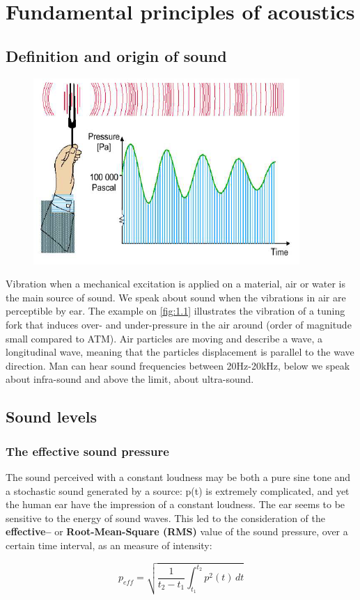 
\chapter{Fundamental principles of acoustics}
\section{Definition and origin of sound}
	\begin{figure}
	\vspace{-6mm}
	\includegraphics[scale=0.5]{acoustics/ch1/1}
	\label{fig:1.1}
	\end{figure}	
	Vibration when a mechanical excitation is applied on a material, air or water is the main source of sound. We speak about sound when the vibrations in air are perceptible by ear. The example on \autoref{fig:1.1} illustrates the vibration of a tuning fork that induces over- and under-pressure in the air around (order of magnitude small compared to ATM). Air particles are moving and describe a wave, a longitudinal wave, meaning that the particles displacement is parallel to the wave direction. Man can hear sound frequencies between 20Hz-20kHz, below we speak about infra-sound and above the limit, about ultra-sound.  
	
\setcounter{section}{4}
\section{Sound levels}
\subsection{The effective sound pressure}
	The sound perceived with a constant loudness may be both a pure sine tone and a stochastic sound generated by a source: p(t) is extremely complicated, and yet the human ear have the impression of a constant loudness. The ear seems to be sensitive to the energy of sound waves. This led to the consideration of the \textbf{effective–} or \textbf{Root-Mean-Square (RMS)} value of the sound pressure, over a certain time interval, as an measure of
intensity:

	\begin{equation}
	p_{eff} = \sqrt{\frac{1}{t_2 - t_1} \int _{t_1}^{t_2}p^2(t) \, dt}
	\end{equation}